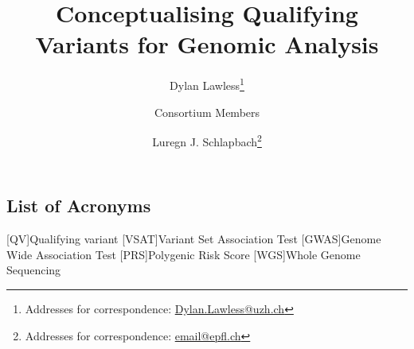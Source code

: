 % 



\usepackage[printonlyused,withpage,nohyperlinks]{acronym}
% 



%

\title{Conceptualising Qualifying Variants for Genomic Analysis}

\author[1]{Dylan Lawless\thanks{Addresses for correspondence: \href{mailto:Dylan.Lawless@uzh.ch}{Dylan.Lawless@uzh.ch}}}
\author[1]{Consortium Members}
\author[1]{Luregn J. Schlapbach\thanks{Addresses for correspondence: \href{mailto:email@epfl.ch}{email@epfl.ch}}}


\maketitle
\justify
\begin{small}
\tableofcontents

\section{List of Acronyms}
\begin{acronym}
 [QV]{Qualifying variant}
 [VSAT]{Variant Set Association Test}
 [GWAS]{Genome Wide Association Test}
 [PRS]{Polygenic Risk Score}
  [WGS]{Whole Genome Sequencing}
\end{acronym}
\end{small}

